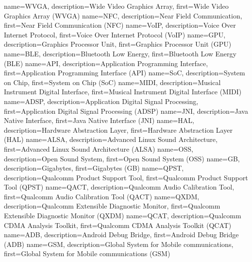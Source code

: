 {
  name={WVGA},
  description={Wide Video Graphics Array},
  first={Wide Video Graphics Array (WVGA)}
}
{
	name={NFC},
	description={Near Field Communication},
	first={Near Field Communication (NFC)}
}
{
	name={VoIP},
	description={Voice Over Internet Protocol},
	first={Voice Over Internet Protocol (VoIP)}
}
{
	name={GPU},
	description={Graphics Processor Unit},
	first={Graphics Processor Unit (GPU)}
}
{
	name={BLE},
	description={Bluetooth Low Energy},
	first={Bluetooth Low Energy (BLE)}
}
{
	name={API},
	description={Application Programming Interface},
	first={Application Programming Interface (API)}
}
{
	name={SoC},
	description={System on Chip},
	first={System on Chip (SoC)}
}
{
	name={MIDI},
	description={Musical Instrument Digital Interface},
	first={Musical Instrument Digital Interface (MIDI)}
}
{
	name={ADSP},
	description={Application Digital Signal Processing},
	first={Application Digital Signal Processing (ADSP)}
}
{
	name={JNI},
	description={Java Native Interface},
	first={Java Native Interface (JNI)}
}
{
	name={HAL},
	description={Hardware Abstraction Layer},
	first={Hardware Abstraction Layer (HAL)}
}
{
	name={ALSA},
	description={Advanced Linux Sound Architecture},
	first={Advanced Linux Sound Architecture (ALSA)}
}
{
	name={OSS},
	description={Open Sound System},
	first={Open Sound System (OSS)}
}
{
	name={GB},
	description={Gigabytes},
	first={Gigabytes (GB)}
}
{
	name={QPST},
	description={Qualcomm Product Support Tool},
	first={Qualcomm Product Support Tool (QPST)}
}
{
	name={QACT},
	description={Qualcomm Audio Calibration Tool},
	first={Qualcomm Audio Calibration Tool (QACT)}
}
{
	name={QXDM},
	description={Qualcomm Extensible Diagnostic Monitor},
	first={Qualcomm Extensible Diagnostic Monitor (QXDM)}
}
{
	name={QCAT},
	description={Qualcomm CDMA Analysis Toolkit},
	first={Qualcomm CDMA Analysis Toolkit (QCAT)}
}
{
	name={ADB},
	description={Android Debug Bridge},
	first={Android Debug Bridge (ADB)}
}
{	
	name={GSM},
	description={Global System for Mobile communications},
	first={Global System for Mobile communications (GSM)}
}